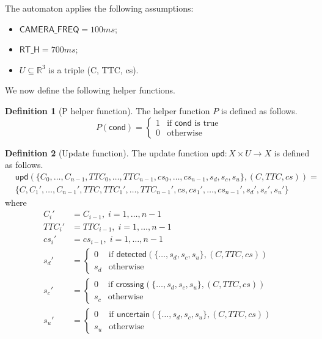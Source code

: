 \documentclass[12pt]{article}
\theoremstyle{definition}
\newtheorem{definition}{Definition}[section]
\begin{document}
The automaton applies the following assumptions:
\begin{itemize}
    \item $\mathsf{CAMERA\_FREQ} = 100ms$;
    \item $\mathsf{RT\_H} = 700ms$;
    \item $U \subseteq \mathbb{R}^3$ is a triple (C, TTC, cs).
\end{itemize}

We now define the following helper functions.
\begin{definition}[P helper function]
    The helper function $P$ is defined as follows.
\[
    P(\mathsf{cond}) =
    \begin{cases}
        1 & \text{if } \mathsf{cond} \text{ is true} \\
        0 & \text{otherwise}
    \end{cases}
\]
\end{definition}

\begin{definition}[Update function]
The update function $\mathsf{upd}: X \times U \to X$ is defined as follows.
    \[
    \begin{aligned}
        &\mathsf{upd}(\{C_0, \ldots, C_{n-1}, TTC_0, \ldots, TTC_{n-1}, cs_0, \ldots, cs_{n-1}, s_d, s_c, s_u\}, (C, TTC, cs)) = \\
        &\{C, C_1', \ldots, C_{n-1}', TTC, TTC_1', \ldots, TTC_{n-1}', cs, cs_1', \ldots, cs_{n-1}', s_d', s_c', s_u'\}
    \end{aligned}
\]
where
\[
    \begin{aligned}
    C_i' &= C_{i-1}, \; i = 1, \dots, n-1 \\
    TTC_i' &= TTC_{i-1}, \; i = 1, \dots, n-1 \\
    cs_i' &= cs_{i-1}, \; i = 1, \dots, n-1 \\
    s_d' &=     
    \begin{cases}
        0 & \text{if } \mathsf{detected}(\{\ldots, s_d, s_c, s_u\}, (C, TTC, cs)) \\
        s_d & \text{otherwise}
    \end{cases}\\
    s_c' &=     
    \begin{cases}
        0 & \text{if } \mathsf{crossing}(\{\ldots, s_d, s_c, s_u\}, (C, TTC, cs)) \\
        s_c & \text{otherwise}
    \end{cases}\\
    s_u' &=     
    \begin{cases}
        0 & \text{if } \mathsf{uncertain}(\{\ldots, s_d, s_c, s_u\}, (C, TTC, cs)) \\
        s_u & \text{otherwise}
    \end{cases}\\
    \end{aligned}
\]
\end{definition}
\end{document}
